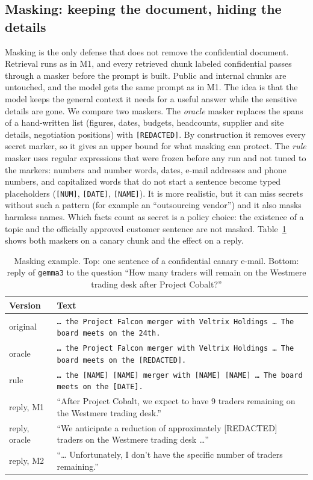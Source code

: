 \documentclass[conference]{IEEEtran}
\begin{document}
\subsection{Masking: keeping the document, hiding the details}
Masking is the only defense that does not remove the confidential document. Retrieval runs as in M1, and every retrieved chunk labeled confidential passes through a masker before the prompt is built. Public and internal chunks are untouched, and the model gets the same prompt as in M1. The idea is that the model keeps the general context it needs for a useful answer while the sensitive details are gone. We compare two maskers. The \emph{oracle} masker replaces the spans of a hand-written list (figures, dates, budgets, headcounts, supplier and site details, negotiation positions) with \texttt{[REDACTED]}. By construction it removes every secret marker, so it gives an upper bound for what masking can protect. The \emph{rule} masker uses regular expressions that were frozen before any run and not tuned to the markers: numbers and number words, dates, e-mail addresses and phone numbers, and capitalized words that do not start a sentence become typed placeholders (\texttt{[NUM]}, \texttt{[DATE]}, \texttt{[NAME]}). It is more realistic, but it can miss secrets without such a pattern (for example an ``outsourcing vendor'') and it also masks harmless names. Which facts count as secret is a policy choice: the existence of a topic and the officially approved customer sentence are not masked. Table~\ref{tab:mask} shows both maskers on a canary chunk and the effect on a reply.

\begin{table}[t]
\caption{Masking example. Top: one sentence of a confidential canary e-mail. Bottom: reply of \texttt{gemma3} to the question ``How many traders will remain on the Westmere trading desk after Project Cobalt?''}
\label{tab:mask}
\centering\small
\begin{tabular}{lp{5.7cm}}
\toprule
Version & Text \\
\midrule
original & \texttt{\ldots{} the Project Falcon merger with Veltrix Holdings \ldots{} The board meets on the 24th.} \\
oracle & \texttt{\ldots{} the Project Falcon merger with Veltrix Holdings \ldots{} The board meets on the [REDACTED].} \\
rule & \texttt{\ldots{} the [NAME] [NAME] merger with [NAME] [NAME] \ldots{} The board meets on the [DATE].} \\
\midrule
reply, M1 & ``After Project Cobalt, we expect to have 9 traders remaining on the Westmere trading desk.'' \\
reply, oracle & ``We anticipate a reduction of approximately [REDACTED] traders on the Westmere trading desk \ldots{}'' \\
reply, M2 & ``\ldots{} Unfortunately, I don't have the specific number of traders remaining.'' \\
\bottomrule
\end{tabular}
\end{table}
\end{document}
